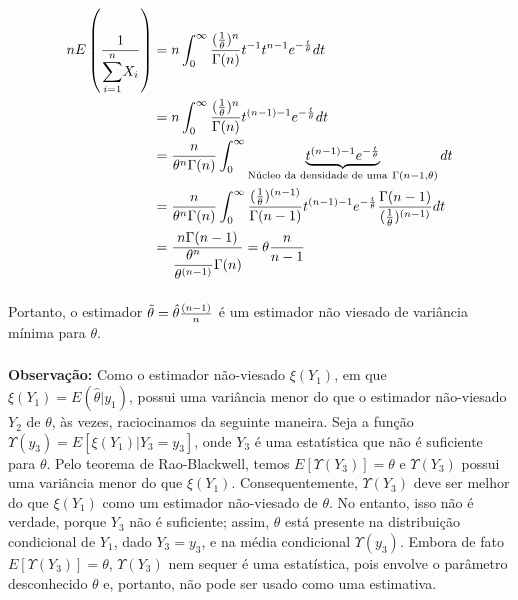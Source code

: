\documentclass[12pt]{beamer}
\begin{document}
\begin{frame}{}
\frametitle{}
\begin{block}{}
\justifying
\begin{align*}
n E\left(\frac{1}{{\displaystyle \sum_{i=1}^{n}} X_{i}}\right) &= n \int_0^{\infty} \frac{(\frac{1}{\theta})^n}{\Gamma(n)} t^{-1}t^{n-1} e^{-\frac{t}{\theta}} dt\\
&= n \int_0^{\infty} \frac{(\frac{1}{\theta})^n}{\Gamma(n)} t^{(n-1)-1} e^{-\frac{t}{\theta}} dt\\
&= \dfrac{n}{\theta^{n}\Gamma(n)} \int_0^{\infty} \underbrace{t^{(n-1)-1} e^{-\frac{t}{\theta}}}_{\text{Núcleo da densidade de uma}~\Gamma(n-1,\theta)} dt\\
&= \dfrac{n}{\theta^{n}\Gamma(n)} \int_0^{\infty}\frac{(\frac{1}{\theta})^{(n-1)}}{\Gamma(n-1)} t^{(n-1)-1} e^{-\frac{t}{\theta}}\frac{\Gamma(n-1)}{(\frac{1}{\theta})^{(n-1)}} dt\\
&=\dfrac{n\Gamma(n-1)}{\dfrac{\theta^{n}}{\theta^{(n-1)}}\Gamma(n)}=\theta\dfrac{n}{n-1}
\end{align*}
\end{block}
\end{frame}

\begin{frame}{}
\frametitle{}
\begin{block}{}
\justifying
Portanto, o estimador $\Tilde{\theta}=\hat{\theta}\frac{(n-1)}{n}$ é um estimador não viesado de variância mínima para $\theta$.
\end{block}
\end{frame}

\begin{frame}{}
\frametitle{}
\begin{block}{}
\justifying
\textbf{Observação:} Como o estimador não-viesado $\xi(Y_1)$, em que $\xi(Y_1) = E(\hat{\theta}|y_1)$, possui uma variância menor do que o estimador não-viesado $Y_2$ de $\theta$, às vezes, raciocinamos da seguinte maneira. Seja a função $\Upsilon(y_3) = E[\xi(Y_1)|Y_3 = y_3]$, onde $Y_3$ é uma estatística que não é suficiente para $\theta$. Pelo teorema de Rao-Blackwell, temos $E[\Upsilon(Y_3)] = \theta$ e $\Upsilon(Y_3)$ possui uma variância menor do que $\xi(Y_1)$. Consequentemente, $\Upsilon(Y_3)$ deve ser melhor do que $\xi(Y_1)$ como um estimador não-viesado de $\theta$. No entanto, isso não é verdade, porque $Y_3$ não é suficiente; assim, $\theta$ está presente na distribuição condicional de $Y_1$, dado $Y_3 = y_3$, e na média condicional $\Upsilon(y_3)$. Embora de fato $E[\Upsilon(Y_3)] = \theta$, $\Upsilon(Y_3)$ nem sequer é uma estatística, pois envolve o parâmetro desconhecido $\theta$ e, portanto, não pode ser usado como uma estimativa.
\end{block}
\end{frame}
\end{document}
